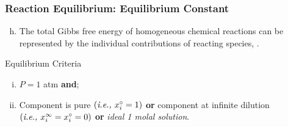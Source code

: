 \documentclass[10pt,compress,handout,unknownkeysallowed]{beamer}
\begin{document}
\begin{frame}
  \frametitle{Reaction Equilibrium: Equilibrium Constant}
      \begin{enumerate}[a)]\setcounter{enumi}{7}
        \item<1-> The total Gibbs free energy of homogeneous chemical reactions can be represented by the individual contributions of reacting species,
            .
      \end{enumerate}

      \begin{block} {\begin{center}Equilibrium Criteria\end{center}}
                  \begin{enumerate}[i)]
                      \item<3-> $P=1$ atm {\bf and};
                      \item<3-> Component is pure $\left(\text{{\it i.e., }} x_{i}^{\circ}=1\right)$ {\bf or } component at infinite dilution $\left(\text{{\it i.e., }} x_{i}^{\infty}=x_{i}^{\circ}=0\right)$ {\bf or} {\it ideal 1 molal solution}.
                   \end{enumerate}
      \end{block}

\end{frame}
\end{document}
